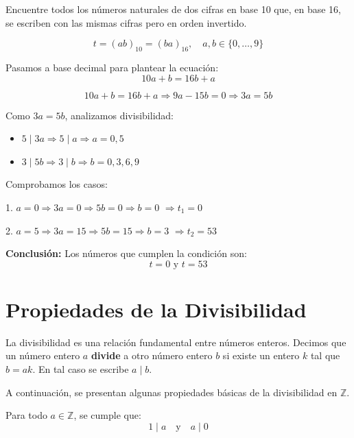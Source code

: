 \documentclass[a4paper,12pt]{article}
\begin{document}
\begin{ejemplo}[title={Ejemplo: Encontrar número con cifras intercambiadas en base 16}]
Encuentre todos los números naturales de dos cifras en base 10 que, en base 16, se escriben con las mismas cifras pero en orden invertido.

\[
t = (ab)_{10} = (ba)_{16}, \quad a,b \in \{0,\dots,9\}
\]

Pasamos a base decimal para plantear la ecuación:
\[
10a + b = 16b + a
\]

\[
10a + b = 16b + a \Rightarrow 9a - 15b = 0 \Rightarrow 3a = 5b
\]

Como \(3a = 5b\), analizamos divisibilidad:

\begin{itemize}
    \item \(5 \mid 3a \Rightarrow 5 \mid a \Rightarrow a = 0,5\)
    \item \(3 \mid 5b \Rightarrow 3 \mid b \Rightarrow b = 0,3,6,9\)
\end{itemize}

Comprobamos los casos:

1. \(a = 0 \Rightarrow 3a = 0 \Rightarrow 5b = 0 \Rightarrow b = 0\)  
   \(\Rightarrow t_1 = 0\)

2. \(a = 5 \Rightarrow 3a = 15 \Rightarrow 5b = 15 \Rightarrow b = 3\)  
   \(\Rightarrow t_2 = 53\)

\medskip
\textbf{Conclusión:} Los números que cumplen la condición son:
\[
\boxed{t = 0 \text{ y } t = 53}
\]
\end{ejemplo}



\section{Propiedades de la Divisibilidad}

La divisibilidad es una relación fundamental entre números enteros.  
Decimos que un número entero \( a \) \textbf{divide} a otro número entero \( b \) si existe un entero \( k \) tal que \( b = ak \).  
En tal caso se escribe \( a \mid b \).

A continuación, se presentan algunas propiedades básicas de la divisibilidad en \( \mathbb{Z} \).

\begin{procedimiento}[title={Propiedad 1}]
Para todo \( a \in \mathbb{Z} \), se cumple que:
\[
1 \mid a \quad \text{y} \quad a \mid 0
\]
\end{procedimiento}
\end{document}
